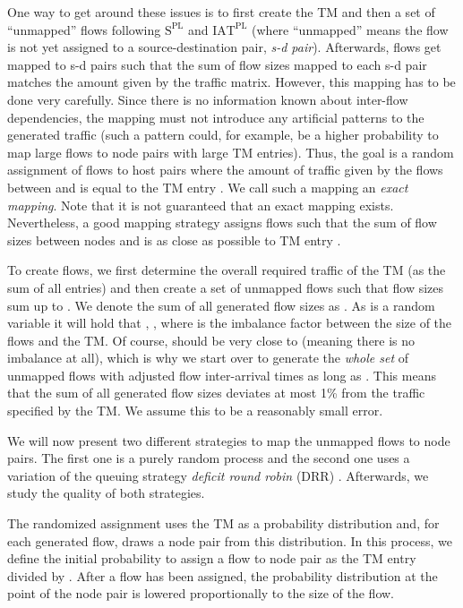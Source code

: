 \documentclass[journal,10pt]{IEEEtran}
\newcommand{\iat}[1] {\ensuremath{\mathrm{IAT}^{\mathrm{#1}}}}
\newcommand{\size}[1]{\ensuremath{\mathrm{S}  ^{\mathrm{#1}}}}
\begin{document}
One way to get around these issues is to first create the TM and then a set of ``unmapped'' flows following \size{PL} and \iat{PL} 
(where ``unmapped'' means the flow is not yet assigned to a source-destination pair, \emph{s-d pair}).
Afterwards, flows get mapped to s-d pairs such that the sum of flow sizes mapped to each s-d pair matches
the amount given by the traffic matrix.
However, this mapping has to be done very carefully. 
Since there is no information known about inter-flow dependencies,
the mapping must not introduce any artificial patterns to the generated traffic 
(such a pattern could, for example, be a higher probability to map large flows to node pairs with large TM entries).
Thus, the goal is a random assignment of flows to host pairs  where the amount of traffic given by the flows between  and  is equal 
to the TM entry .
We call such a mapping an \emph{exact mapping}.
Note that it is not guaranteed that an exact mapping exists.
Nevertheless, a good mapping strategy assigns flows such that the sum of flow sizes between nodes  and  is as close as possible to TM entry .

To create flows, we first determine the overall required traffic  of the TM (as the sum of all entries) 
and then create a set of unmapped flows such that flow sizes sum up to . We denote the sum of all generated flow sizes as .
As  is a random variable it will hold that , ,
where  is the imbalance factor between the size of the flows and the TM.
Of course,  should be very close to  (meaning there is no imbalance at all), which is why we start over to generate
the \emph{whole set} of unmapped flows with adjusted flow inter-arrival times as long as
. This means that the sum of all generated flow sizes deviates at most 1\% from the traffic specified by the TM.
We assume this to be a reasonably small error.


We will now present two different strategies to map the unmapped flows to node pairs. The first one is a purely random process and the second one uses a variation of the queuing strategy
\emph{deficit round robin} (DRR) \cite{shreedhar1995efficient}. Afterwards, we study the quality of both strategies.

The randomized assignment uses the TM as a probability distribution and, for each generated flow, draws a node pair from this distribution.
In this process, we define the initial probability to assign a flow to node pair  as the TM entry  divided by .
After a flow has been assigned, the probability distribution at the point of the node pair is lowered proportionally to the size of the flow.
\end{document}
